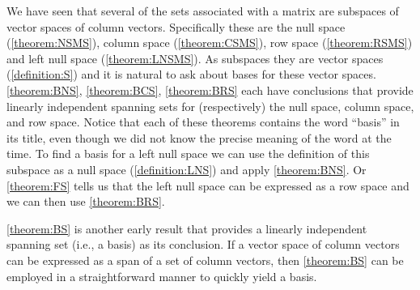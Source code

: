 \documentclass{ximera}
\begin{document}
We have seen that several of the sets associated with a matrix are
subspaces of vector spaces of column vectors.  Specifically these are
the null space (\ref{theorem:NSMS}), column space
(\ref{theorem:CSMS}), row space (\ref{theorem:RSMS}) and left null
space (\ref{theorem:LNSMS}).  As subspaces they are vector spaces
(\ref{definition:S}) and it is natural to ask about bases for these
vector spaces.  \ref{theorem:BNS}, \ref{theorem:BCS},
\ref{theorem:BRS} each have conclusions that provide linearly
independent spanning sets for (respectively) the null space, column
space, and row space.  Notice that each of these theorems contains the
word ``basis'' in its title, even though we did not know the precise
meaning of the word at the time.  To find a basis for a left null
space we can use the definition of this subspace as a null space
(\ref{definition:LNS}) and apply \ref{theorem:BNS}.  Or
\ref{theorem:FS} tells us that the left null space can be expressed as
a row space and we can then use \ref{theorem:BRS}.

\ref{theorem:BS} is another early result that provides a linearly
independent spanning set (i.e., a basis) as its conclusion.  If a
vector space of column vectors can be expressed as a span of a set of
column vectors, then \ref{theorem:BS} can be employed in a
straightforward manner to quickly yield a basis.
\end{document}
